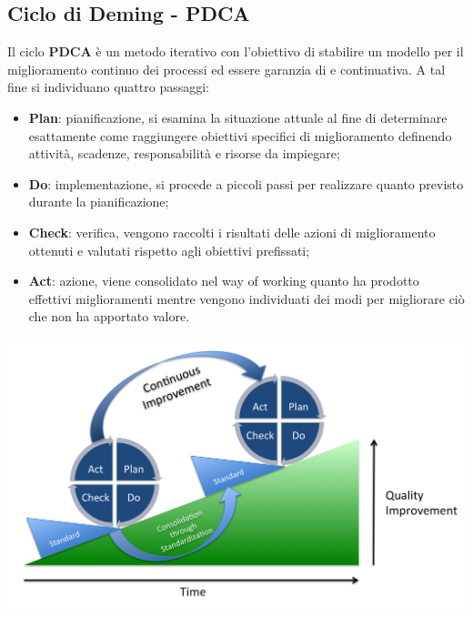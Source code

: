 \subsection{Ciclo di Deming - PDCA} \label{PDCA}
Il ciclo \textbf{PDCA} è un metodo iterativo con l'obiettivo di stabilire un modello per il miglioramento continuo dei processi ed essere garanzia di   e continuativa.
A tal fine si individuano quattro passaggi:
\begin{itemize}
	\item\textbf{Plan}: pianificazione, si esamina la situazione attuale al fine di determinare esattamente come raggiungere obiettivi specifici di miglioramento definendo attività, scadenze, responsabilità e risorse da impiegare;
	\item\textbf{Do}: implementazione, si procede a piccoli passi per realizzare quanto previsto durante la pianificazione;
	\item\textbf{Check}: verifica, vengono raccolti i risultati delle azioni di miglioramento ottenuti e valutati rispetto agli obiettivi prefissati;
	\item\textbf{Act}: azione, viene consolidato nel way of working quanto ha prodotto effettivi miglioramenti mentre vengono individuati dei modi per migliorare ciò che non ha apportato valore.
\end{itemize}
\begin{center}
\includegraphics[scale=0.25]{Immagini/PDCA.png}
\end{center}

\newpage
